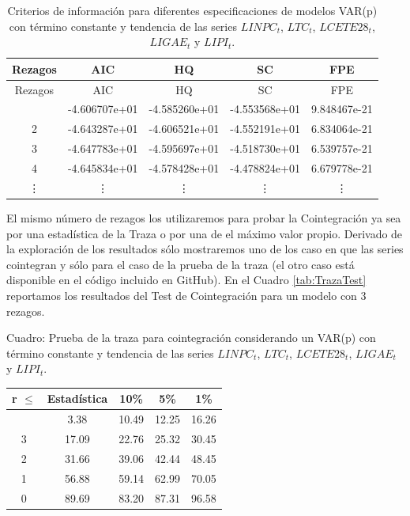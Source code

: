 \documentclass[
]{book}
\begin{document}
\begin{longtable}[]{@{}ccccc@{}}
\caption{\label{tab:SelectVARVEC} Criterios de información para diferentes especificaciones de modelos VAR(p) con término constante y tendencia de las series \(LINPC_t\), \(LTC_t\), \(LCETE28_t\), \(LIGAE_t\) y \(LIPI_t\).}\tabularnewline
\toprule\noalign{}
Rezagos & AIC & HQ & SC & FPE \\
\midrule\noalign{}
\endfirsthead
\toprule\noalign{}
Rezagos & AIC & HQ & SC & FPE \\
\midrule\noalign{}
\endhead
\bottomrule\noalign{}
\endlastfoot
1 & -4.606707e+01 & -4.585260e+01 & -4.553568e+01 & 9.848467e-21 \\
2 & -4.643287e+01 & -4.606521e+01 & -4.552191e+01 & 6.834064e-21 \\
3 & -4.647783e+01 & -4.595697e+01 & -4.518730e+01 & 6.539757e-21 \\
4 & -4.645834e+01 & -4.578428e+01 & -4.478824e+01 & 6.679778e-21 \\
\vdots & \vdots & \vdots & \vdots & \vdots \\
\end{longtable}

El mismo número de rezagos los utilizaremos para probar la Cointegración ya sea por una estadística de la Traza o por una de el máximo valor propio. Derivado de la exploración de los resultados sólo mostraremos uno de los caso en que las series cointegran y sólo para el caso de la prueba de la traza (el otro caso está disponible en el código incluido en GitHub). En el Cuadro \ref{tab:TrazaTest} reportamos los resultados del Test de Cointegración para un modelo con 3 rezagos.

Cuadro: \label{tab:TrazaTest} Prueba de la traza para cointegración considerando un VAR(p) con término constante y tendencia de las series \(LINPC_t\), \(LTC_t\), \(LCETE28_t\), \(LIGAE_t\) y \(LIPI_t\).

\begin{longtable}[]{@{}ccccc@{}}
\toprule\noalign{}
r \(\leq\) & Estadística & 10\% & 5\% & 1\% \\
\midrule\noalign{}
\endhead
\bottomrule\noalign{}
\endlastfoot
4 & 3.38 & 10.49 & 12.25 & 16.26 \\
3 & 17.09 & 22.76 & 25.32 & 30.45 \\
2 & 31.66 & 39.06 & 42.44 & 48.45 \\
1 & 56.88 & 59.14 & 62.99 & 70.05 \\
0 & 89.69 & 83.20 & 87.31 & 96.58 \\
\end{longtable}
\end{document}
